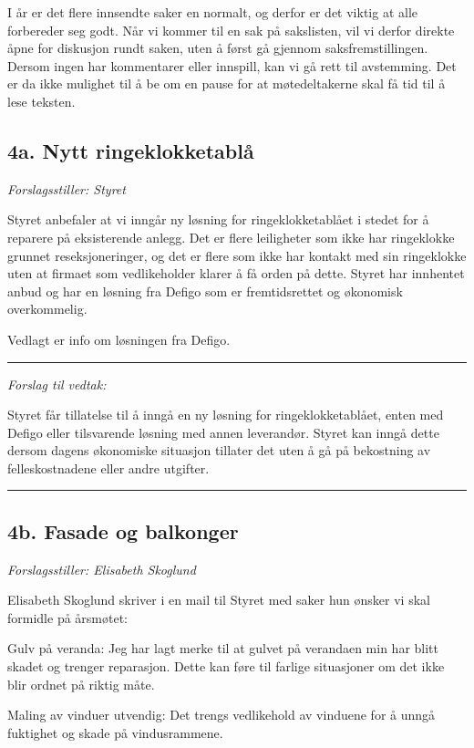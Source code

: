 \documentclass[12pt]{article}
\begin{document}
I år er det flere innsendte saker en normalt, og derfor er det viktig at alle forbereder seg
godt. Når vi kommer til en sak på sakslisten, vil vi derfor direkte åpne for diskusjon rundt saken,
uten å først gå gjennom saksfremstillingen. Dersom ingen har kommentarer eller innspill, kan vi gå
rett til avstemming. Det er da ikke mulighet til å be om en pause for at møtedeltakerne skal få tid
til å lese teksten.

\subsection*{4a. Nytt ringeklokketablå}

{\em Forslagsstiller: Styret}

Styret anbefaler at vi inngår ny løsning for ringeklokketablået i stedet for å reparere på
eksisterende anlegg. Det er flere leiligheter som ikke har ringeklokke grunnet reseksjoneringer, og
det er flere som ikke har kontakt med sin ringeklokke uten at firmaet som vedlikeholder klarer å få
orden på dette. Styret har innhentet anbud og har en løsning fra Defigo som er fremtidsrettet og
økonomisk overkommelig.

Vedlagt er info om løsningen fra Defigo.

{\rule{\textwidth}{0.3pt}}

{\em Forslag til vedtak:}

Styret får tillatelse til å inngå en ny løsning for ringeklokketablået, enten med Defigo eller
tilsvarende løsning med annen leverandør. Styret kan inngå dette dersom dagens økonomiske situasjon
tillater det uten å gå på bekostning av felleskostnadene eller andre utgifter.\\
{\rule{\textwidth}{0.3pt}}

\subsection*{4b. Fasade og balkonger}

{\em Forslagsstiller: Elisabeth Skoglund}

Elisabeth Skoglund skriver i en mail til Styret med saker hun ønsker vi skal formidle på årsmøtet:

Gulv på veranda: Jeg har lagt merke til at gulvet på verandaen min har blitt skadet og trenger
reparasjon. Dette kan føre til farlige situasjoner om det ikke blir ordnet på riktig måte.

Maling av vinduer utvendig: Det trengs vedlikehold av vinduene for å unngå fuktighet og skade på
vindusrammene.
\end{document}
